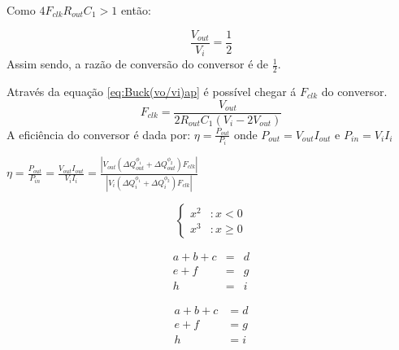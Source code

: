 \documentclass[../Main.tex]{article}
\begin{document}
Como $4F_{clk}R_{out}C_1 > 1$ então: 

\begin{equation}
\label{eq:Buck(vo/vi)f}
\frac{V_{out}}{V_i} = \frac{1}{2}
\end{equation}
\vspace{5mm}  
Assim sendo, a razão de conversão do conversor é de $\frac{1}{2}$.

Através da equação \ref{eq:Buck(vo/vi)ap} é possível chegar á $F_{clk}$ do conversor.
\begin{equation}
\label{eq:FBuck(vo/vi)}
F_{clk}=\frac{V_{out}}{2R_{out}C_{1}(V_i-2V_{out})}
\end{equation}
\vspace{5mm}
A eficiência do conversor é dada por: $\eta = \frac{P_{out}}{P_{i}}$ onde $P_{out} = V_{out}I_{out}$ e $P_{in} = V_{i}I_{i}$

\begin{center}
{\large $\eta = \frac{P_{out}}{P_{in}} = \frac{ V_{out}I_{out}}{ V_iI_i} = \frac{|V_{out}(\Delta Q^{\phi_1}_{out} + \Delta Q^{\phi_2}_{out})F_{clk}|}{{|V_i(\Delta Q^{\phi_1}_{i} + \Delta Q^{\phi_2}_{i})F_{clk}|}}$}
\end{center}


\[\left\{
  \begin{array}{lr}
    x^2 & : x < 0\\
    x^3 & : x \ge 0
  \end{array}
\right.
\]

\begin{equation}
  \begin{array}{rrr}
    a + b + c & = & d \\        e + f     & = & g \\        h         & = & i
  \end{array}
\end{equation}

\begin{equation}
  \begin{aligned}
    a + b + c & =  d \\        e + f     & =  g \\        h         & =  i
  \end{aligned}
\end{equation}
\end{document}
